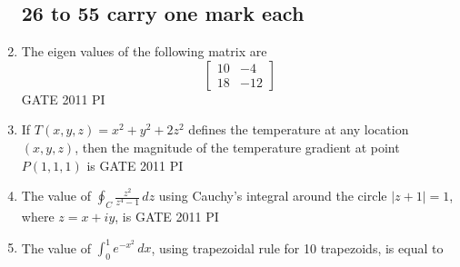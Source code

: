 \documentclass[journal,12pt,onecolumn]{IEEEtran}
\theoremstyle{remark}
\begin{document}
\begin{enumerate}
\subsection{26 to 55 carry one mark each}


\item
The eigen values of the following matrix are
\[
\begin{bmatrix}
10 & -4 \\
18 & -12
\end{bmatrix}
\]
\hfill{GATE 2011 PI}
\begin{enumerate}
\end{enumerate}

\item
If $T(x, y, z) = x^2 + y^2 + 2z^2$ defines the temperature at any location $(x, y, z)$, then the magnitude of the temperature gradient at point $P(1,1,1)$ is
\hfill{GATE 2011 PI}
\begin{enumerate}
\end{enumerate}

\item
The value of $\displaystyle \oint_C \frac{z^2}{z^4 - 1}\,dz$ using Cauchy's integral around the circle $|z+1|=1$, where $z = x + iy$, is
\hfill{GATE 2011 PI}
\begin{enumerate}
\end{enumerate}
\item
The value of $\displaystyle \int_{0}^{1} e^{-x^2} \, dx$, using trapezoidal rule for 10 trapezoids, is equal to


\end{enumerate}
\end{document}
